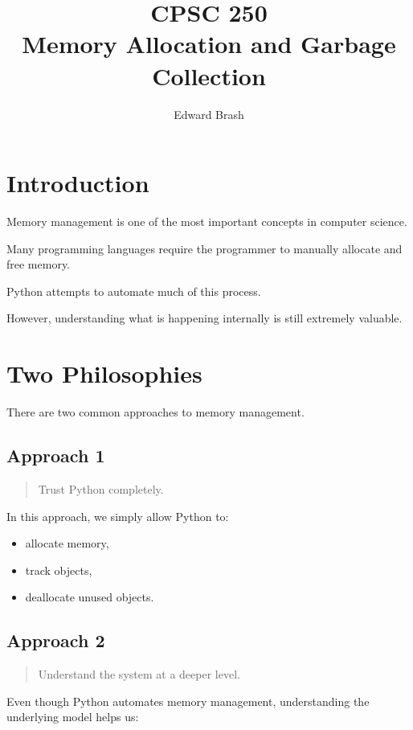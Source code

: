 \documentclass[11pt]{article}
\title{CPSC 250 \\ Memory Allocation and Garbage Collection}
\author{Edward Brash}
\date{}
\begin{document}
\maketitle

\section{Introduction}

Memory management is one of the most important concepts in computer science.

Many programming languages require the programmer to manually allocate and free memory.

Python attempts to automate much of this process.

However, understanding what is happening internally is still extremely valuable.

\section{Two Philosophies}

There are two common approaches to memory management.

\subsection{Approach 1}

\begin{quote}
Trust Python completely.
\end{quote}

In this approach, we simply allow Python to:

\begin{itemize}
    \item allocate memory,
    \item track objects,
    \item deallocate unused objects.
\end{itemize}

\subsection{Approach 2}

\begin{quote}
Understand the system at a deeper level.
\end{quote}

Even though Python automates memory management, understanding the underlying model helps us:
\end{document}
